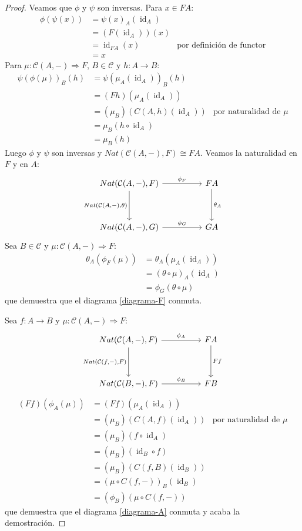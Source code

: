 \documentclass[12pt, twoside]{book}
\newcommand{\cat}{{\mathcal{C}}}
\DeclareMathOperator{\id}{id}
\begin{document}
\begin{proof}
Veamos que $\phi$ y $\psi$ son inversas. Para $x \in F A$:
\begin{align*}
 \phi(\psi(x)) & = \psi(x)_A(\id_A)\\
 & = (F (\id_A))(x)\\
 & = \id_{F A}(x) & \text{por definición de functor}\\
 & = x
\end{align*}
Para $\mu \colon \cat(A,-) \Rightarrow F$, $B \in \cat$ y $h \colon A \to B$:
\begin{align*}
 \psi(\phi(\mu))_B(h) & = \psi(\mu_A(\id_A))_B(h)\\
 & = (F h)(\mu_A(\id_A))\\
 & = (\mu_B)(C(A,h)(\id_A)) & \text{por naturalidad de }\mu\\
 & = \mu_B(h\circ \id_A)\\
 & = \mu_B(h)
\end{align*}
Luego $\phi$ y $\psi$ son inversas y $Nat(\cat(A,-),F) \cong F A$.
Veamos la naturalidad en $F$ y en $A$:
\begin{equation}\label{diagrama-F}
\begin{tikzcd}
  {Nat(\cat(A,-),F)} \arrow[rr,"\phi_F"] \arrow[dd,"{Nat(\cat(A,-),\theta)}" left] & & F A \arrow[dd,"\theta_A"]\\
  &\\
  {Nat(\cat(A,-),G)} \arrow[rr,"\phi_G"] & & G A
\end{tikzcd}
\end{equation}
Sea $B \in \cat$ y $\mu \colon \cat(A,-) \Rightarrow F$:
\begin{align*}
 \theta_A(\phi_F(\mu)) & = \theta_A(\mu_A(\id_A))\\
 & = (\theta \circ \mu)_A(\id_A)\\
 & = \phi_G(\theta \circ \mu)
\end{align*}
que demuestra que el diagrama \ref{diagrama-F} conmuta.

Sea $f \colon A \to B$ y $\mu \colon \cat(A,-) \Rightarrow F$:
\begin{equation}\label{diagrama-A}
\begin{tikzcd}
  {Nat(\cat(A,-),F)} \arrow[rr,"\phi_A"] \arrow[dd,"{Nat(\cat(f,-),F)}" left] & & F A \arrow[dd,"F f"]\\
  &\\
  {Nat(\cat(B,-),F)} \arrow[rr,"\phi_B"] & & F B
\end{tikzcd}
\end{equation}
\begin{align*}
 (F f)(\phi_A(\mu)) & = (F f)(\mu_A(\id_A))\\
 & = (\mu_B)(C(A,f)(\id_A)) & \text{por naturalidad de }\mu\\
 & = (\mu_B)(f \circ \id_A)\\
 & = (\mu_B)(\id_B \circ f)\\
 & = (\mu_B)(C(f,B)(\id_B))\\
 & = (\mu \circ C(f,-))_B(\id_B)\\
 & = (\phi_B)(\mu \circ C(f,-))
\end{align*}
que demuestra que el diagrama \ref{diagrama-A} conmuta y acaba la demostración.
\end{proof}
\end{document}
